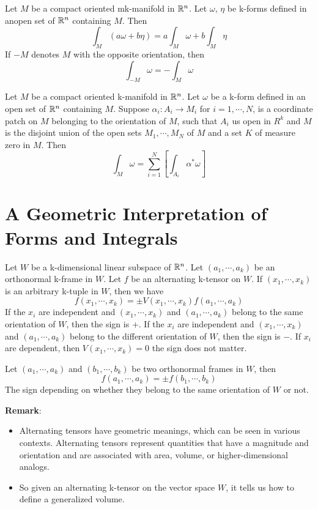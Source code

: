 \begin{theorem}
    Let $M$ be a compact oriented mk-manifold in $\mathbb{R}^n$. Let $\omega$, $\eta$ be k-forms defined in anopen set of $\mathbb{R}^n$ containing $M$. Then $$\int_M(a\omega+b\eta)=a\int_M\omega +b\int_M\eta$$
    If $-M$ denotes $M$ with the opposite orientation, then $$\int_{-M}\omega=-\int_M\omega$$
\end{theorem}

\begin{theorem}
    Let $M$ be a compact oriented k-manifold in $\mathbb{R}^n$. Let $\omega$ be a k-form defined in an open set of $\mathbb{R}^n$ containing $M$. 
    Suppose $\alpha_i:A_i\longrightarrow M_i$ for $i=1,\cdots,N$, is a coordinate patch on $M$ belonging to the orientation of $M$, such that $A_i$ us open in $R^k$ and $M$ is the disjoint union of the open sets $M_1,\cdots,M_N$ of $M$ and a set $K$ of measure zero in $M$. Then $$\int_M\omega=\sum_{i=1}^N[\int_{A_i}\alpha^*\omega]$$
\end{theorem}

\section{A Geometric Interpretation of Forms and Integrals}

\begin{theorem}
    Let $W$ be a k-dimensional linear subspace of $\mathbb{R}^n$. 
    Let $(a_1,\cdots,a_k)$ be an orthonormal k-frame in $W$. 
    Let $f$ be an alternating k-tensor on $W$. 
    If $(x_1,\cdots,x_k)$ is an arbitrary k-tuple in $W$, then we have 
    $$f(x_1,\cdots,x_k)=\pm V(x_1,\cdots,x_k)f(a_1,\cdots,a_k)$$
    If the $x_i$ are independent and $(x_1,\cdots,x_k)$ and $(a_1,\cdots,a_k)$ belong to the same orientation of $W$, then the sign is $+$.
    If the $x_i$ are independent and $(x_1,\cdots,x_k)$ and $(a_1,\cdots,a_k)$ belong to the different orientation of $W$, then the sign is $-$. 
    If $x_i$ are dependent, then $V(x_1,\cdots,x_k)=0$ the sign does not matter. 
\end{theorem}

\begin{corollary}
    Let $(a_1,\cdots,a_k)$ and $(b_1,\cdots,b_k)$ be two orthonormal frames in $W$, then $$f(a_1,\cdots,a_k)=\pm f(b_1,\cdots,b_k)$$
    The sign depending on whether they belong to the same orientation of $W$ or not.
\end{corollary}

\noindent\textbf{Remark}:
\begin{itemize}
    \item Alternating tensors have geometric meanings, which can be seen in various contexts. Alternating tensors represent quantities that have a magnitude and orientation and are associated with area, volume, or higher-dimensional analogs.
    \item So given an alternating k-tensor on the vector space $W$, it tells us how to define a generalized volume.
\end{itemize}

